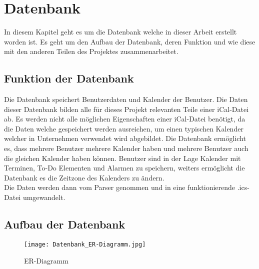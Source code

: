 \renewcommand{\theauthor}{Matthias Franz}
\section{Datenbank}
\label{sec:datenbank}
In diesem Kapitel geht es um die Datenbank welche in dieser Arbeit erstellt worden ist. Es geht um den Aufbau der Datenbank, deren Funktion und wie diese mit den anderen Teilen des Projektes zusammenarbeitet.

\subsection{Funktion der Datenbank}
\label{sec:funktionDatenbank}
Die Datenbank speichert Benutzerdaten und Kalender der Benutzer. Die Daten dieser Datenbank bilden alle für dieses Projekt relevanten Teile einer iCal-Datei ab. Es werden nicht alle möglichen Eigenschaften einer iCal-Datei benötigt, da die Daten welche gespeichert werden ausreichen, um einen typischen Kalender welcher in Unternehmen verwendet wird abgebildet. Die Datenbank ermöglicht es, dass mehrere Benutzer mehrere Kalender haben und mehrere Benutzer auch die gleichen Kalender haben können. Benutzer sind in der Lage Kalender mit Terminen, To-Do Elementen und Alarmen zu speichern, weiters ermöglicht die Datenbank es die Zeitzone des Kalenders zu ändern.
\\
Die Daten werden dann vom Parser genommen und in eine funktionierende .ics-Datei umgewandelt. 

\subsection{Aufbau der Datenbank}
\label{sec:aufbauDatenbank}

\pagebreak
\begin{figure}[H]
	\texttt{[image: Datenbank\_ER-Diagramm.jpg]}
    \caption{ER-Diagramm}
    \label{fig:sprintBacklog}
\end{figure}
	
\pagebreak